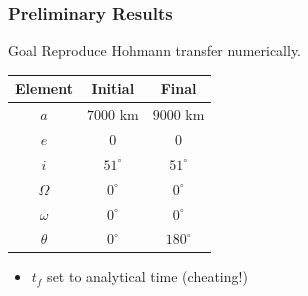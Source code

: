 \documentclass{beamer}
\begin{document}
\begin{frame}
    \frametitle{Preliminary Results}
    \pause
    \begin{block}{Goal}
        Reproduce Hohmann transfer numerically.    
    \end{block}
    \pause
    \begin{table}[htbp]
        \centering
        \begin{tabular}{ccc} \toprule
            Element & Initial & Final \\ \midrule
            \(a\)      & \(7000\) km   & \(9000\) km   \\
            \(e\)      & \(0\)        & \(0\)        \\
            \(i\)      & \(51^\circ\) & \(51^\circ\) \\
            \(\Omega\) & \(0^\circ\)  & \(0^\circ\)  \\
            \(\omega\) & \(0^\circ\)  & \(0^\circ\)  \\
            \(\theta\) & \(0^\circ\)  & \(180^\circ\)  \\ \bottomrule
        \end{tabular}
    \end{table}
    \begin{itemize}
        \item \(t_f\) set to analytical time (cheating!)
    \end{itemize}
\end{frame}
\end{document}

